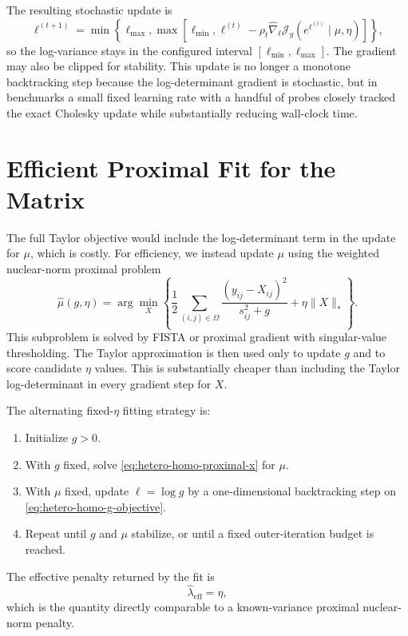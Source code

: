 \documentclass[11pt]{article}
\begin{document}
The resulting stochastic update is
\begin{equation}
    \ell^{(t+1)}
        =
        \min\left\{
            \ell_{\max},
            \max\left[
                \ell_{\min},
                \ell^{(t)}
                -
                \rho_t \widehat{\nabla}_{\ell}
    \mathcal{J}_g(e^{\ell^{(t)}}\mid \mu,\eta)
            \right]
        \right\},
\end{equation}
so the log-variance stays in the configured interval
$[\ell_{\min},\ell_{\max}]$.  The gradient may also be clipped for stability.
This update is no longer a monotone backtracking step because the
log-determinant gradient is stochastic, but in benchmarks a small fixed
learning rate with a handful of probes closely tracked the exact Cholesky
update while substantially reducing wall-clock time.


\section{Efficient Proximal Fit for the Matrix}

The full Taylor objective would include the log-determinant term in the update
for $\mu$, which is costly.  For efficiency, we instead update $\mu$ using the
weighted nuclear-norm proximal problem
\begin{equation}
    \hat\mu(g,\eta)
        =
        \arg\min_X
        \left\{
            \frac{1}{2}
            \sum_{(i,j)\in\Omega}
            \frac{(y_{ij}-X_{ij})^2}{s_{ij}^2+g}
            +
            \eta\|X\|_*
        \right\}.
        \label{eq:hetero-homo-proximal-x}
\end{equation}
This subproblem is solved by FISTA or proximal gradient with singular-value
thresholding.  The Taylor approximation is then used only to update $g$ and to
score candidate $\eta$ values.  This is substantially cheaper than including
the Taylor log-determinant in every gradient step for $X$.

The alternating fixed-$\eta$ fitting strategy is:
\begin{enumerate}
    \item Initialize $g>0$.
    \item With $g$ fixed, solve \eqref{eq:hetero-homo-proximal-x} for $\mu$.
    \item With $\mu$ fixed, update $\ell=\log g$ by a one-dimensional
          backtracking step on \eqref{eq:hetero-homo-g-objective}.
    \item Repeat until $g$ and $\mu$ stabilize, or until a fixed outer-iteration
          budget is reached.
\end{enumerate}
The effective penalty returned by the fit is
\begin{equation}
    \hat\lambda_{\mathrm{eff}}
        =
        \eta,
\end{equation}
which is the quantity directly comparable to a known-variance proximal
nuclear-norm penalty.
\end{document}
